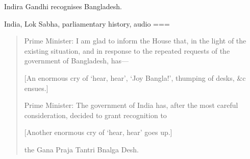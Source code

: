 Indira Gandhi recognises Bangladesh.

India, Lok Sabha, parliamentary history, audio
===
\begin{quote}
Prime Minister: I am glad to inform the House that, in the light of the existing situation, and in response to the repeated requests of the government of Bangladesh, has—

[An enormous cry of ‘hear, hear’, ‘Joy Bangla!’, thumping of desks, \&c ensues.]

Prime Minister: The government of India has, after the most careful consideration, decided to grant recognition to

[Another enormous cry of ‘hear, hear’ goes up.]

the Gana Praja Tantri Bnalga Desh.
\end{quote}
\nocite{2021e}\nocite{1971}
